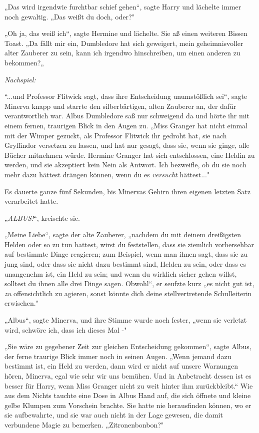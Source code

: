 {„Das wird irgendwie furchtbar schief gehen“, sagte Harry und lächelte immer noch gewaltig. „Das weißt du doch, oder?"

„Oh ja, das weiß ich“, sagte Hermine und lächelte. Sie aß einen weiteren Bissen Toast. „Da fällt mir ein, Dumbledore hat sich geweigert, mein geheimnisvoller alter Zauberer zu sein, kann ich irgendwo hinschreiben, um einen anderen zu bekommen?„

\emph{\emph{Nachspiel:}}

“...und Professor Flitwick sagt, dass ihre Entscheidung unumstößlich sei“, sagte Minerva knapp und starrte den silberbärtigen, alten Zauberer an, der dafür verantwortlich war. Albus Dumbledore saß nur schweigend da und hörte ihr mit einem fernen, traurigen Blick in den Augen zu. „Miss Granger hat nicht einmal mit der Wimper gezuckt, als Professor Flitwick ihr gedroht hat, sie nach Gryffindor versetzen zu lassen, und hat nur gesagt, dass sie, wenn sie ginge, alle Bücher mitnehmen würde. Hermine Granger hat sich entschlossen, eine Heldin zu werden, und sie akzeptiert kein Nein als Antwort. Ich bezweifle, ob du sie noch mehr dazu hättest drängen können, wenn du es \emph{versucht} hättest..."

Es dauerte ganze fünf Sekunden, bis Minervas Gehirn ihren eigenen letzten Satz verarbeitet hatte.

„\emph{ALBUS!}“, kreischte sie.

„Meine Liebe“, sagte der alte Zauberer, „nachdem du mit deinem dreißigsten Helden oder so zu tun hattest, wirst du feststellen, dass sie ziemlich vorhersehbar auf bestimmte Dinge reagieren; zum Beispiel, wenn man ihnen sagt, dass sie zu jung sind, oder dass sie nicht dazu bestimmt sind, Helden zu sein, oder dass es unangenehm ist, ein Held zu sein; und wenn du wirklich sicher gehen willst, solltest du ihnen alle drei Dinge sagen. Obwohl“, er seufzte kurz „es nicht gut ist, \emph{zu} offensichtlich zu agieren, sonst könnte dich deine stellvertretende Schulleiterin erwischen."

„Albus“, sagte Minerva, und ihre Stimme wurde noch fester, „wenn sie verletzt wird, schwöre ich, dass ich dieses Mal -"

„Sie wäre zu gegebener Zeit zur gleichen Entscheidung gekommen“, sagte Albus, der ferne traurige Blick immer noch in seinen Augen. „Wenn jemand dazu bestimmt ist, ein Held zu werden, dann wird er nicht auf unsere Warnungen hören, Minerva, egal wie sehr wir uns bemühen. Und in Anbetracht dessen ist es besser für Harry, wenn Miss Granger nicht zu weit hinter ihm zurückbleibt.“ Wie aus dem Nichts tauchte eine Dose in Albus Hand auf, die sich öffnete und kleine gelbe Klumpen zum Vorschein brachte. Sie hatte nie herausfinden können, wo er sie aufbewahrte, und sie war auch nicht in der Lage gewesen, die damit verbundene Magie zu bemerken. „Zitronenbonbon?"

}
